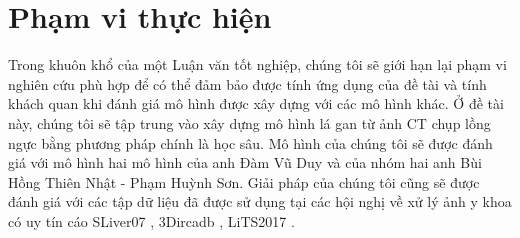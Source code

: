 \section{Phạm vi thực hiện}
Trong khuôn khổ của một Luận văn tốt nghiệp, chúng tôi sẽ giới hạn lại phạm vi nghiên cứu phù hợp để có thể đảm bảo được tính ứng dụng của đề tài và tính khách quan khi đánh giá mô hình được xây dựng với các mô hình khác. Ở đề tài này, chúng tôi sẽ tập trung vào xây dựng mô hình lá gan từ ảnh CT chụp lồng ngực bằng phương pháp chính là học sâu. Mô hình của chúng tôi sẽ được đánh giá với mô hình hai mô hình của anh Đàm Vũ Duy và của nhóm hai anh Bùi Hồng Thiên Nhật - Phạm Huỳnh Sơn. Giải pháp của chúng tôi cũng sẽ được đánh giá với các tập dữ liệu đã được sử dụng tại các hội nghị về xử lý ảnh y khoa có uy tín cáo SLiver07 \cite{website:slvier07}, 3Dircadb \cite{website:data_3DIRCADb}, LiTS2017 \cite{website:LiTS}.